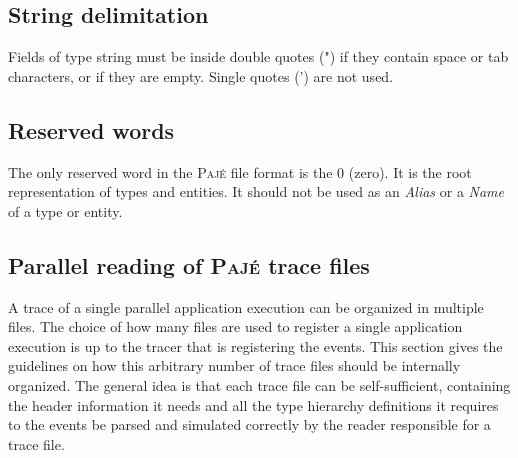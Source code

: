 \documentclass[12pt]{article}
\newcommand{\Paje}{\textsc{Paj\'e}\xspace}
\newcommand{\PajeField}[1]{\emph{#1}\xspace}
\newcommand{\Name}{\PajeField{Name}}
\newcommand{\Alias}{\PajeField{Alias}}
\begin{document}
\subsection{String delimitation}
Fields of type string must be inside double quotes (") if they contain
space or tab characters, or if they are empty. Single quotes (') are
not used.

\subsection{Reserved words}
The only reserved word in the \Paje file format is the 0 (zero). It is
the root representation of types and entities. It should not be used
as an \Alias or a \Name of a type or entity.




\subsection{Parallel reading of \Paje trace files}
\label{s.ParallelReading}

A trace of a single parallel application execution can be organized in
multiple files. The choice of how many files are used to register a
single application execution is up to the tracer that is registering
the events. This section gives the guidelines on how this arbitrary
number of trace files should be internally organized.  The general
idea is that each trace file can be self-sufficient, containing the
header information it needs and all the type hierarchy definitions it
requires to the events be parsed and simulated correctly by the reader
responsible for a trace file.
\end{document}
